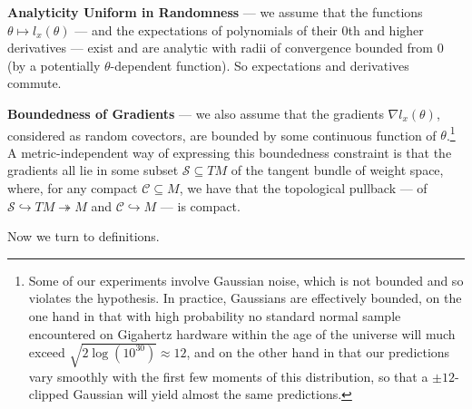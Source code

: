 \documentclass[final,12pt]{colt2021} %
\newcommand{\Cc}{\mathcal{C}}   \newcommand{\CC}{\mathbb{C}}
\newcommand{\Ss}{\mathcal{S}}
\begin{document}
        \textbf{Analyticity Uniform in Randomness} --- we assume that
        the functions $\theta \mapsto l_x(\theta)$ --- and the expectations
        of polynomials of their $0$th and higher derivatives --- exist and are
        analytic with radii of convergence bounded from $0$ (by a potentially
        $\theta$-dependent function).  So expectations and derivatives commute. 

        \textbf{Boundedness of Gradients} --- we also assume that the gradients
        $\nabla l_x(\theta)$, considered as random covectors, are bounded by
        some continuous function of $\theta$.\footnote{
            Some of our experiments involve Gaussian noise, which is not
            bounded and so violates the hypothesis.  In practice, Gaussians are
            effectively bounded, on the one hand in that with high
            probability no standard normal sample encountered on Gigahertz
            hardware within the age of the universe will much exceed $\sqrt{2
            \log(10^{30})} \approx 12$, and on the other hand in that
            our predictions vary smoothly with the first few moments of this
            distribution, so that a $\pm 12$-clipped Gaussian will yield almost
            the same predictions.
        }
        A metric-independent way of expressing this boundedness constraint
        is that the gradients all lie in some subset $\Ss \subseteq TM$ of
        the tangent bundle of weight space, where, for any compact $\Cc
        \subseteq M$, we have that the topological pullback --- of
        $\Ss \hookrightarrow TM \twoheadrightarrow M$
        and
        $\Cc \hookrightarrow M$ ---
        is compact.
        
        Now we turn to definitions.
\end{document}
